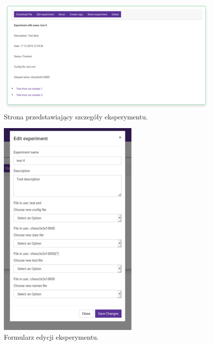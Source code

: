 \begin{figure}[htb]
	\centering
	\includegraphics[width=15cm]{grafika/details_page.eps}
	\caption{Strona przedstawiający szczegóły eksperymentu.}
	\label{rys12_details_page}
\end{figure}

\begin{figure}[htb]
	\centering
	\includegraphics[height=11cm]{grafika/edit_experiment.eps}
	\caption{Formularz edycji eksperymentu.}
	\label{rys13_edit_experiment}
\end{figure}

